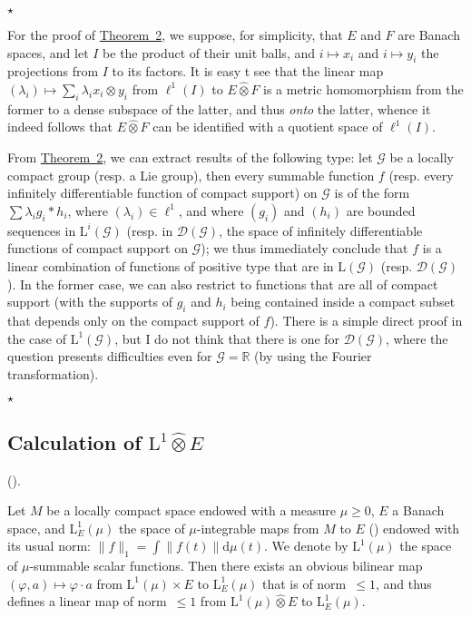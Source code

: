 \documentclass{article}
\theoremstyle{plain}
\newcommand{\aster}[1]{$\star${#1}$\star$}
\newcommand{\LL}{\mathrm{L}}
\renewcommand{\ll}{\ell}
\newcommand{\hotimes}{\widehat{\otimes}}
\newcommand{\scr}{\mathscr}
\newcommand{\dd}{\mathrm{d}}
\newcommand{\oldpage}[1]{\marginpar{\footnotesize$\Big\vert$ \textit{p.~#1}}}
\begin{document}
\aster{
  For the proof of \hyperref[1.theorem2]{Theorem~2}, we suppose, for simplicity, that $E$ and $F$ are Banach spaces, and let $I$ be the product of their unit balls, and $i\mapsto x_i$ and $i\mapsto y_i$ the projections from $I$ to its factors.
  It is easy t see that the linear map $(\lambda_i)\mapsto\sum_i\lambda_i x_i\otimes y_i$ from $\ll^1(I)$ to $E\hotimes F$ is a metric homomorphism from the former to a dense subspace of the latter, and thus \emph{onto} the latter, whence it indeed follows that $E\hotimes F$ can be identified with a quotient space of $\ll^1(I)$.

  From \hyperref[1.theorem2]{Theorem~2}, we can extract results of the following type:
  let $\scr{G}$ be a
\oldpage{79}
  locally compact group (resp. a Lie group), then every summable function $f$ (resp. every infinitely differentiable function of compact support) on $\scr{G}$ is of the form $\sum\lambda_i g_i*h_i$, where $(\lambda_i)\in\ll^1$, and where $(g_i)$ and $(h_i)$ are bounded sequences in $\LL^i(\scr{G})$ (resp. in $\scr{D}(\scr{G})$, the space of infinitely differentiable functions of compact support on $\scr{G}$);
  we thus immediately conclude that $f$ is a linear combination of functions of positive type that are in $\LL(\scr{G})$ (resp. $\scr{D}(\scr{G})$).
  In the former case, we can also restrict to functions that are all of compact support (with the supports of $g_i$ and $h_i$ being contained inside a compact subset that depends only on the compact support of $f$).
  There is a simple direct proof in the case of $\LL^1(\scr{G})$, but I do not think that there is one for $\scr{D}(\scr{G})$, where the question presents difficulties even for $\scr{G}=\mathbb{R}$ (by using the Fourier transformation).
}


\subsection{Calculation of \texorpdfstring{$\LL^1\hotimes E$}{L1(x)E}}
\label{1.3}

(\cite[chap.~I, \S2, n\textsuperscript{o}~2]{PTT}).
\medskip

Let $M$ be a locally compact space endowed with a measure $\mu\geq0$, $E$ a Banach space, and $\LL_E^1(\mu)$ the space of $\mu$-integrable maps from $M$ to $E$ (\cite{2}) endowed with its usual norm: $\|f\|_1=\int\|f(t)\|\dd\mu(t)$.
We denote by $\LL^1(\mu)$ the space of $\mu$-summable scalar functions.
Then there exists an obvious bilinear map $(\varphi,a)\mapsto\varphi\cdot a$ from $\LL^1(\mu)\times E$ to $\LL_E^1(\mu)$ that is of norm~$\leq1$, and thus defines a linear map of norm~$\leq1$ from $\LL^1(\mu)\hotimes E$ to $\LL_E^1(\mu)$.
\end{document}
